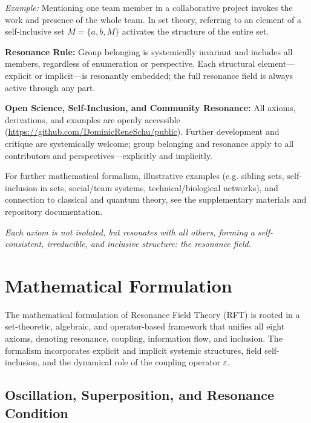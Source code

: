 \documentclass[12pt]{article}
\begin{document}
	\textit{Example:} Mentioning one team member in a collaborative project invokes the work and presence of the whole team. In set theory, referring to an element of a self-inclusive set $M = \{a, b, M\}$ activates the structure of the entire set.
	
	\medskip
	
	\textbf{Resonance Rule:}  
	Group belonging is systemically invariant and includes all members, regardless of enumeration or perspective. Each structural element—explicit or implicit—is resonantly embedded; the full resonance field is always active through any part.
	
	\medskip
	
	\textbf{Open Science, Self-Inclusion, and Community Resonance:}  
	All axioms, derivations, and examples are openly accessible (\url{https://github.com/DominicReneSchu/public}). Further development and critique are systemically welcome; group belonging and resonance apply to all contributors and perspectives—explicitly and implicitly.
	
	\medskip
	
	For further mathematical formalism, illustrative examples (e.g. sibling sets, self-inclusion in sets, social/team systems, technical/biological networks), and connection to classical and quantum theory, see the supplementary materials and repository documentation.
	
	\medskip
	
	\textit{Each axiom is not isolated, but resonates with all others, forming a self-consistent, irreducible, and inclusive structure: the resonance field.}

	
	\section{Mathematical Formulation}
	
	The mathematical formulation of Resonance Field Theory (RFT) is rooted in a set-theoretic, algebraic, and operator-based framework that unifies all eight axioms, denoting resonance, coupling, information flow, and inclusion. The formalism incorporates explicit and implicit systemic structures, field self-inclusion, and the dynamical role of the coupling operator $\varepsilon$.
	
	\subsection{Oscillation, Superposition, and Resonance Condition}
	
\end{document}
